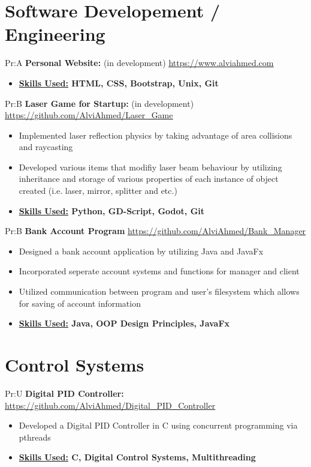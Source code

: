 \section{Software Developement / Engineering}


Pr:A
\textbf{Personal Website: }  (in development) \underline{\url{https://www.alviahmed.com}}
\begin{itemize}[noitemsep,nolistsep]
\item \textbf{\underline{Skills Used:} HTML, CSS, Bootstrap, Unix, Git}
\end{itemize}


Pr:B
\textbf{Laser Game for Startup: } (in development) \underline{\url{https://github.com/AlviAhmed/Laser_Game}}
\begin{itemize}[noitemsep,nolistsep]
\item Implemented laser reflection physics by taking advantage of area collisions and raycasting
\item Developed various items that modifiy laser beam behaviour by utilizing inheritance and storage of
  various properties of each instance of object created (i.e. laser, mirror, splitter and etc.)
\item \textbf{\underline{Skills Used:} Python, GD-Script, Godot, Git}
\end{itemize}


Pr:B
\textbf{Bank Account Program}
\underline{\url{https://github.com/AlviAhmed/Bank_Manager}}
\begin{itemize}[noitemsep,nolistsep]
\item Designed a bank account application by utilizing Java and JavaFx
\item Incorporated seperate account systems and functions for manager and client 
\item Utilized communication between program and user's filesystem which allows for saving of account information 
\item \textbf{\underline{Skills Used:} Java, OOP Design Principles, JavaFx}
\end{itemize}
\vspace{1em}


\section*{Control Systems}


Pr:U
\vspace{\spaces}
\textbf{Digital PID Controller: } \underline{\url{https://github.com/AlviAhmed/Digital_PID_Controller}}
\begin{itemize}[noitemsep,nolistsep]
\item Developed a Digital PID Controller in C using concurrent programming via pthreads
\item \textbf{ \underline{Skills Used:} C, Digital Control Systems, Multithreading}
\end{itemize}


